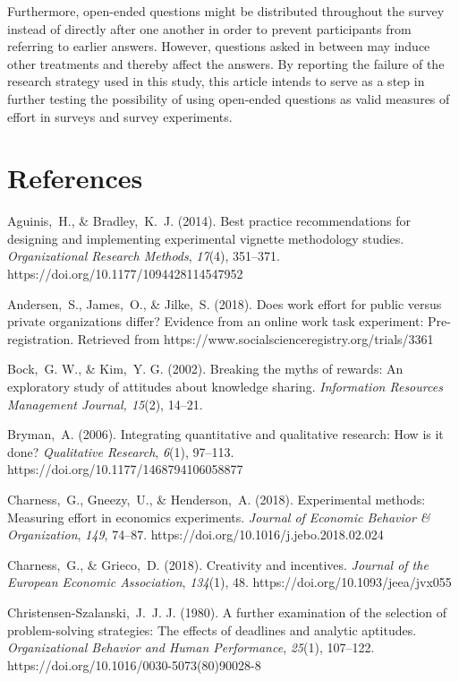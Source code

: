 \documentclass{article}
\begin{document}
Furthermore, open-ended questions might be distributed throughout the survey instead of directly after one another in order to prevent participants from referring to earlier answers. However, questions asked in between may induce other treatments and thereby affect the answers. By reporting the failure of the research strategy used in this study, this article intends to serve as a step in further testing the possibility of using open-ended questions as valid measures of effort in surveys and survey experiments.



\section{\textbf{References}}

Aguinis, H., \& Bradley, K. J. (2014). Best practice recommendations for designing and implementing experimental vignette methodology studies. \emph{Organizational Research Methods}, \emph{17}(4), 351--371. https://doi.org/10.1177/1094428114547952

Andersen, S., James, O., \& Jilke, S. (2018). Does work effort for public versus private organizations differ? Evidence from an online work task experiment: Pre-registration. Retrieved from https://www.socialscienceregistry.org/trials/3361

Bock, G. W., \& Kim, Y. G. (2002). Breaking the myths of rewards: An exploratory study of attitudes about knowledge sharing. \emph{Information Resources Management Journal, 15}(2), 14--21.

Bryman, A. (2006). Integrating quantitative and qualitative research: How is it done? \emph{Qualitative Research}, \emph{6}(1), 97--113. https://doi.org/10.1177/1468794106058877

Charness, G., Gneezy, U., \& Henderson, A. (2018). Experimental methods: Measuring effort in economics experiments. \emph{Journal of Economic Behavior \& Organization}, \emph{149}, 74--87. https://doi.org/10.1016/j.jebo.2018.02.024

Charness, G., \& Grieco, D. (2018). Creativity and incentives. \emph{Journal of the European Economic Association}, \emph{134}(1), 48. https://doi.org/10.1093/jeea/jvx055

Christensen-Szalanski, J. J. J. (1980). A further examination of the selection of problem-solving strategies: The effects of deadlines and analytic aptitudes. \emph{Organizational Behavior and Human Performance}, \emph{25}(1), 107--122. https://doi.org/10.1016/0030-5073(80)90028-8
\end{document}
